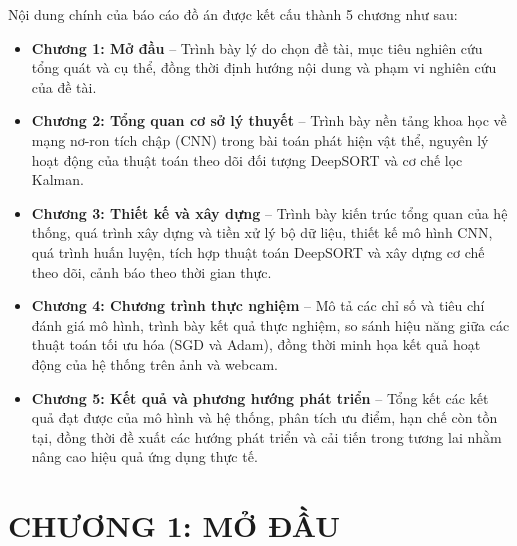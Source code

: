 \documentclass[a4paper,12pt]{article}
\begin{document}
Nội dung chính của báo cáo đồ án được kết cấu thành 5 chương như sau:
\begin{itemize}
    \item \textbf{Chương 1: Mở đầu} -- Trình bày lý do chọn đề tài, mục tiêu nghiên cứu tổng quát và cụ thể, đồng thời định hướng nội dung và phạm vi nghiên cứu của đề tài.
    \item \textbf{Chương 2: Tổng quan cơ sở lý thuyết} -- Trình bày nền tảng khoa học về mạng nơ-ron tích chập (CNN) trong bài toán phát hiện vật thể, nguyên lý hoạt động của thuật toán theo dõi đối tượng DeepSORT và cơ chế lọc Kalman.
    \item \textbf{Chương 3: Thiết kế và xây dựng} -- Trình bày kiến trúc tổng quan của hệ thống, quá trình xây dựng và tiền xử lý bộ dữ liệu, thiết kế mô hình CNN, quá trình huấn luyện, tích hợp thuật toán DeepSORT và xây dựng cơ chế theo dõi, cảnh báo theo thời gian thực.
    \item \textbf{Chương 4: Chương trình thực nghiệm} -- Mô tả các chỉ số và tiêu chí đánh giá mô hình, trình bày kết quả thực nghiệm, so sánh hiệu năng giữa các thuật toán tối ưu hóa (SGD và Adam), đồng thời minh họa kết quả hoạt động của hệ thống trên ảnh và webcam.
    \item \textbf{Chương 5: Kết quả và phương hướng phát triển} -- Tổng kết các kết quả đạt được của mô hình và hệ thống, phân tích ưu điểm, hạn chế còn tồn tại, đồng thời đề xuất các hướng phát triển và cải tiến trong tương lai nhằm nâng cao hiệu quả ứng dụng thực tế.
\end{itemize}

\newpage 

\section{CHƯƠNG 1: MỞ ĐẦU} 
\end{document}
